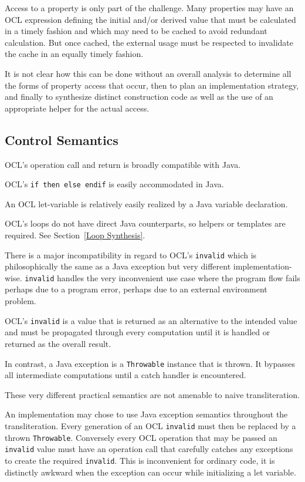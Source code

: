 \documentclass[sigconf]{acmart}
\begin{document}
Access to a property is only part of the challenge. Many properties may have an OCL expression defining the initial and/or derived value that must be calculated in a timely fashion and which may need to be cached to avoid redundant calculation. But once cached, the external usage must be respected to invalidate the cache in an equally timely fashion.

It is not clear how this can be done without an overall analysis to determine all the forms of property access that occur, then to plan an implementation strategy, and finally to synthesize distinct construction code as well as the use of an appropriate helper for the actual access.

\subsection{Control Semantics}

OCL's operation call and return is broadly compatible with Java.

OCL's \verb|if then else endif| is easily accommodated in Java.

An OCL let-variable is relatively easily realized by a Java variable declaration.

OCL's loops do not have direct Java counterparts, so helpers or templates are required. See Section~\ref{Loop Synthesis}.

There is a major incompatibility in regard to OCL's \verb|invalid| which is philosophically the same as a Java exception but very different implementation-wise.
\texttt{invalid} handles the very inconvenient use case where the program flow fails perhaps due to a program error, perhaps due to an external environment problem.

OCL's \texttt{invalid} is a value that is returned as an alternative to the intended value and must be propagated through every computation until it is handled or returned as the overall result.

In contrast, a Java exception is a \texttt{Throwable} instance that is thrown. It bypasses all intermediate computations until a catch handler is encountered.

These very different practical semantics are not amenable to naive transliteration.

An implementation may chose to use Java exception semantics throughout the transliteration. Every generation of an OCL \texttt{invalid} must then be replaced by a thrown \texttt{Throwable}. Conversely every OCL operation that may be passed an \texttt{invalid} value must have an operation call that carefully catches any exceptions to create the required \texttt{invalid}. This is inconvenient for ordinary code, it is distinctly awkward when the exception can occur while initializing a let variable.
\end{document}

